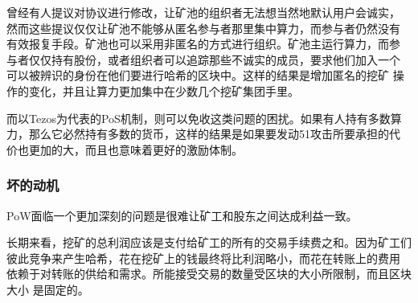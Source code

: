 \documentclass[letterpaper]{article}
\begin{document}
曾经有人提议对协议进行修改，让矿池的组织者无法想当然地默认用户会诚实，
然而这些提议仅仅让矿池不能够从匿名参与者那里集中算力，而参与者仍然没有
有效报复手段。矿池也可以采用非匿名的方式进行组织。矿池主运行算力，而参
与者仅仅持有股份，或者组织者可以追踪那些不诚实的成员，要求他们加入一个
可以被辨识的身份在他们要进行哈希的区块中。这样的结果是增加匿名的挖矿
操作的变化，并且让算力更加集中在少数几个挖矿集团手里。

而以Tezos为代表的PoS机制，则可以免收这类问题的困扰。如果有人持有多数算
力，那么它必然持有多数的货币，这样的结果是如果要发动51攻击所要承担的代
价也更加的大，而且也意味着更好的激励体制。

\subsubsection{坏的动机}
PoW面临一个更加深刻的问题是很难让矿工和股东之间达成利益一致。

长期来看，挖矿的总利润应该是支付给矿工的所有的交易手续费之和。因为矿工们
彼此竞争来产生哈希，花在挖矿上的钱最终将比利润略小，而花在转账上的费用
依赖于对转账的供给和需求。所能接受交易的数量受区块的大小所限制，而且区块大小
是固定的。
\end{document}

